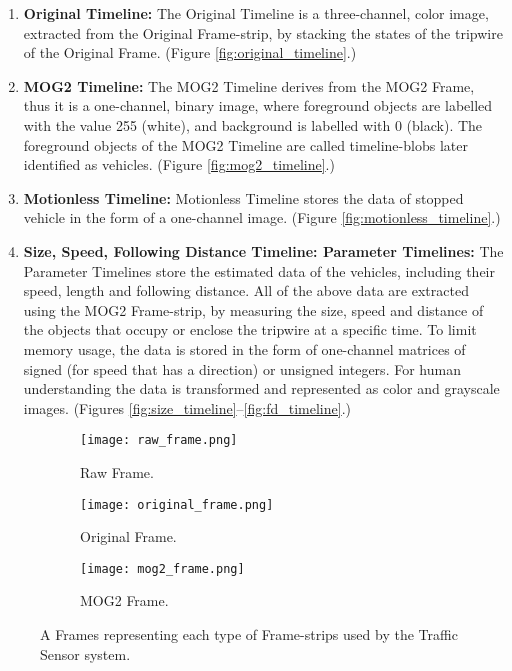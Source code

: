 \begin{enumerate}
	\item \textbf{Original Timeline:} The Original Timeline is a three-channel, color image, extracted from the Original Frame-strip, by stacking the states of the tripwire of the Original Frame. (Figure \ref{fig:original_timeline}.)
	
	\item \textbf{MOG2 Timeline:} The MOG2 Timeline derives from the MOG2 Frame, thus it is a one-channel, binary image, where foreground objects are labelled with the value 255 (white), and background is labelled with 0 (black). The foreground objects of the MOG2 Timeline are called timeline-blobs later identified as vehicles. (Figure \ref{fig:mog2_timeline}.)
	
	\item \textbf{Motionless Timeline:} Motionless Timeline stores the data of stopped vehicle in the form of a one-channel image. (Figure \ref{fig:motionless_timeline}.)
	
	\item \textbf{Size, Speed, Following Distance Timeline: Parameter Timelines:}
	The Parameter Timelines store the estimated data of the vehicles, including their speed, length and following distance. All of the above data are extracted using the MOG2 Frame-strip, by measuring the size, speed and distance of the objects that occupy or enclose the tripwire at a specific time.
	To limit memory usage, the data is stored in the form of one-channel matrices of signed (for speed that has a direction) or unsigned integers. For human understanding the data is transformed and represented as color and grayscale images. (Figures \ref{fig:size_timeline}--\ref{fig:fd_timeline}.)
\end{enumerate}

\begin{figure}[!h]
	\centering
	\begin{subfigure}[!h]{0.5\textwidth}
		\texttt{[image: raw\_frame.png]}
		\caption{Raw Frame. \label{fig:raw_frame}}
	\end{subfigure}
	\quad
	\begin{subfigure}[!h]{0.35\textwidth}
		\texttt{[image: original\_frame.png]}
		\caption{Original Frame.\label{fig:original_frame}}
	\end{subfigure}
	\hfill
	\begin{subfigure}[!h]{0.35\textwidth}
		\texttt{[image: mog2\_frame.png]}
		\caption{MOG2 Frame. \label{fig:mog2_frame}}
	\end{subfigure}
	\caption{A Frames representing each type of Frame-strips used by the Traffic Sensor system.\label{fig:frame_types}}
\end{figure}

